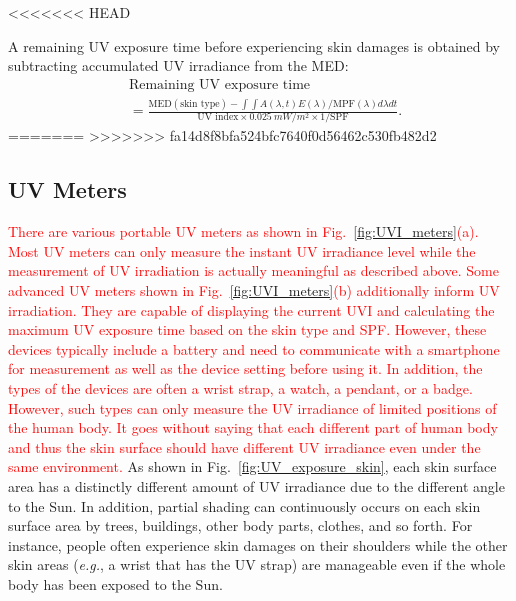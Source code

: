 \documentclass[journal]{IEEEtran}
\begin{document}
<<<<<<< HEAD

A remaining UV exposure time before experiencing skin damages is obtained by subtracting accumulated UV irradiance from the MED:
%
\begin{equation}
\begin{split}
&\text{Remaining~UV~exposure~time} \\
&= \frac{\text{MED}(\text{skin~type}) - \int \int A(\lambda, t)E(\lambda) / \text{MPF}(\lambda) d \lambda dt}{\text{UV~index} \times 0.025~mW/m^2 \times 1/\text{SPF}}.
\end{split}
\end{equation}
=======
>>>>>>> fa14d8f8bfa524bfc7640f0d56462c530fb482d2

%
%


\subsection{UV Meters}
\textcolor{red}{There are various portable UV meters as shown in Fig.~\ref{fig:UVI_meters}(a). Most UV meters can only measure the instant UV irradiance level while the measurement of UV irradiation is actually meaningful as described above. Some advanced UV meters shown in Fig.~\ref{fig:UVI_meters}(b) additionally inform UV irradiation. They are capable of displaying the current  UVI and calculating the maximum UV exposure time based on the skin type and SPF. However, these devices typically include a battery and need to communicate with a smartphone~\cite{Netatmo, Ultra} for measurement as well as the device setting before using it. In addition, the types of the devices are often a wrist strap, a watch, a pendant, or a badge. However, such types can only measure the UV irradiance of limited positions of the human body. It goes without saying that each different part of human body and thus the skin surface should have different UV irradiance even under the same environment.} 
%
As shown in Fig.~\ref{fig:UV_exposure_skin}, each skin surface area has a distinctly different amount of UV irradiance due to the different angle to the Sun. In addition, partial shading can continuously occurs on each skin surface area by trees, buildings, other body parts, clothes, and so forth. For instance, people often experience skin damages on their shoulders while the other skin areas (\textit{e.g.}, a wrist that has the UV strap) are manageable even if the whole body has been exposed to the Sun.
\end{document}
